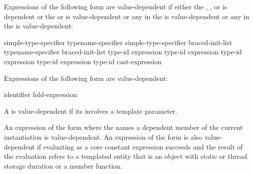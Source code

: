\pnum
Expressions of the following form are value-dependent if either the
,
, or
is dependent or the
or
is value-dependent or
any  in the 
is value-dependent or
any  in the 
is value-dependent:

\begin{ncsimplebnf}
simple-type-specifier \terminal{(}  \terminal{)}\br
typename-specifier \terminal{(}  \terminal{)}\br
simple-type-specifier braced-init-list\br
typename-specifier braced-init-list\br
{} \terminal{<} type-id \terminal{>} \terminal{(} expression \terminal{)}\br
{} \terminal{<} type-id \terminal{>} \terminal{(} expression \terminal{)}\br
{} \terminal{<} type-id \terminal{>} \terminal{(} expression \terminal{)}\br
{} \terminal{<} type-id \terminal{>} \terminal{(} expression \terminal{)}\br
\terminal{(} type-id \terminal{)} cast-expression
\end{ncsimplebnf}

\pnum
Expressions of the following form are value-dependent:

\begin{ncsimplebnf}
  \terminal{(} identifier \terminal{)}\br
fold-expression
\end{ncsimplebnf}

\pnum
A 
is value-dependent if
its  involves a template parameter.

\pnum
An expression of the form \tcode{\&} where the
 names a dependent member of the current
instantiation is value-dependent.
An expression of the form \tcode{\&}
is also value-dependent if evaluating 
as a core constant expression succeeds and
the result of the evaluation refers to a templated entity
that is an object with static or thread storage duration or a member function.

